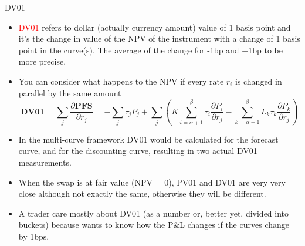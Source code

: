 \documentclass{beamer}
\begin{document}
\begin{frame}{DV01}
\begin{itemize}
	\item<1-> \textcolor{red}{DV01} refers to dollar (actually currency amount) value of 1 basis point and it's the change in value of the NPV of the instrument with a change of 1 basis point in the curve(s). The average of the change for -1bp and +1bp to be more precise. 
	\item<2-> You can consider what happens to the NPV if every rate $r_i$ is changed in parallel by the same amount
	\begin{equation*}
	\textbf{DV01} = \sum_j \frac{\partial \textbf{PFS}}{\partial r_j} = -\sum_{j}\tau_jP_j+\sum_{j}\left(K\sum_{i=\alpha+1}^\beta\tau_i\frac{\partial P_i}{\partial r_j} - \sum_{k=\alpha+1}^\beta L_k\tau_k\frac{\partial P_k}{\partial r_j}\right)
	\end{equation*}
	\item<3-> In the multi-curve framework DV01 would be calculated for the forecast curve, and for the discounting curve, resulting in two actual DV01 measurements.
    \item<4-> When the swap is at fair value (NPV = 0), PV01 and DV01 are very very close although not exactly the same, otherwise they will be different.
    \item<5-> A trader care mostly about DV01 (as a number or, better yet, divided into buckets) because wants to know how the P\&L changes if the curves change by 1bps.
\end{itemize}
\end{frame}
\end{document}
